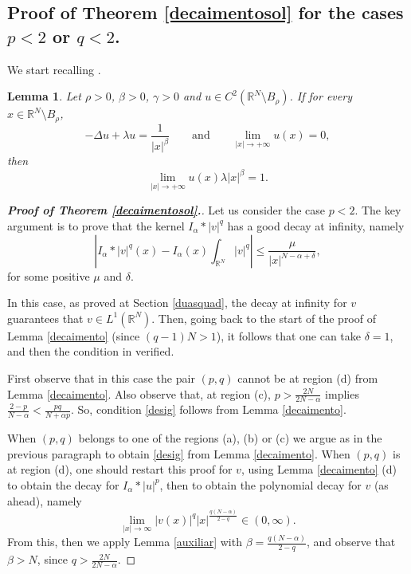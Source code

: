 \documentclass[12pt,a4paper]{article}
\newtheorem{lemma}[theorem]{Lemma}
\numberwithin{equation}{section}
\begin{document}
\subsection{Proof of Theorem \ref{decaimentosol} for the cases $p<2$ or $q<2$.} \label{secsub}

We start recalling \cite[Lemma 6.7]{Moroz2013}.
\begin{lemma}\label{lpmenor2}
Let $\rho > 0$, $\beta >0$, $\gamma > 0$ and $u\in C^2(\mathbb{R}^N \setminus B_\rho)$. If for every $x\in \mathbb{R}^N \setminus B_\rho$, 
$$
-\Delta u +\lambda u = \dfrac{1}{|x|^\beta} \qquad \text{and} \qquad
\lim\limits_{|x|\rightarrow +\infty}u(x)=0,
$$
then
$$
\lim\limits_{|x|\rightarrow +\infty}u(x)\lambda |x|^\beta = 1.
$$
\end{lemma}

\medbreak
\begin{proof}[\textbf{Proof of Theorem \ref{decaimentosol}.}] Let us consider the case $p<2$. The key argument is to prove that the kernel $I_{\alpha}\ast |v|^q$ has a good decay at infinity, namely
\begin{equation}\label{desig}
\left| I_\alpha \ast |v|^q (x) - I_\alpha(x)\int_{\mathbb{R}^N} |v|^q \right| \leq \dfrac{\mu}{|x|^{N-\alpha+\delta}},
\end{equation}
for some positive $\mu$ and $\delta$.

\medbreak
{} In this case, as proved at Section \ref{duasquad}, the decay at infinity for $v$ guarantees that $v\in L^1(\mathbb{R}^N)$. Then, going back to the start of the proof of Lemma \ref{decaimento} (since $(q-1)N >1$), it follows that one can take $\delta=1$, and then the condition in verified.

\medbreak
{} First observe that in this case the pair $(p,q)$ cannot be at region (d) from Lemma \ref{decaimento}. Also observe that, at region (c), $p> \frac{2N}{2N-\alpha}$ implies $\frac{2-p}{N-\alpha}< \frac{pq}{N+\alpha p}$. So, condition \eqref{desig} follows from Lemma \ref{decaimento}.


\medbreak
{} When $(p,q)$ belongs to one of the regions (a), (b) or (c) we argue as in the previous paragraph to obtain \eqref{desig} from Lemma \ref{decaimento}. When $(p,q)$ is at region (d), one should restart this proof for $v$, using Lemma \ref{decaimento} (d) to obtain the decay for $I_{\alpha}\ast |u|^p$, then to obtain the polynomial decay for $v$ (as ahead), namely
\[
\lim \limits_{|x| \to \infty} |v(x)|^q |x|^{\frac{q(N-\alpha)}{2-q}} \in (0, \infty).
\]
From this, then we apply Lemma \ref{auxiliar} with $\beta = \frac{q(N-\alpha)}{2-q}$, and observe that $\beta>N$, since $q> \frac{2N}{2N-\alpha}$.



\end{proof}
\end{document}
